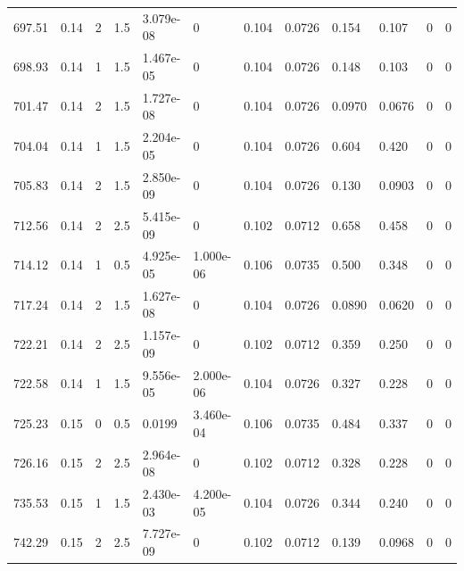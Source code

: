 \documentclass[preview]{standalone}
\begin{document}
{{{{{\begin{tabular}{L{1.2cm}C{1.2cm} C{0.3cm}C{0.5cm} C{1.4cm}C{1.4cm} C{1.4cm}C{1.4cm} C{1.6cm}C{1.6cm} C{1.6cm}C{1.6cm}}
  697.51  &  0.14  & 2     & 1.5 &  3.079e-08  & 0  &  0.104&   0.0726& 0.154 & 0.107   &  0 & 0  \\ 
  698.93  &  0.14  & 1     & 1.5 &  1.467e-05  & 0  &  0.104&   0.0726& 0.148 & 0.103   &  0 & 0  \\ 
  701.47  &  0.14  & 2     & 1.5 &  1.727e-08  & 0  &  0.104&   0.0726& 0.0970 & 0.0676   &  0 & 0  \\ 
  704.04  &  0.14  & 1     & 1.5 &  2.204e-05  & 0  &  0.104&   0.0726& 0.604 & 0.420   &  0 & 0  \\ 
  705.83  &  0.14  & 2     & 1.5 &  2.850e-09  & 0  &  0.104&   0.0726& 0.130 & 0.0903   &  0 & 0  \\ 
  712.56  &  0.14  & 2     & 2.5 &  5.415e-09  & 0  &  0.102&   0.0712& 0.658 & 0.458   &  0 & 0  \\ 
  714.12  &  0.14  & 1     & 0.5 &  4.925e-05  & 1.000e-06  &  0.106&   0.0735& 0.500 & 0.348   &  0 & 0  \\ 
  717.24  &  0.14  & 2     & 1.5 &  1.627e-08  & 0  &  0.104&   0.0726& 0.0890 & 0.0620   &  0 & 0  \\ 
  722.21  &  0.14  & 2     & 2.5 &  1.157e-09  & 0  &  0.102&   0.0712& 0.359 & 0.250   &  0 & 0  \\ 
  722.58  &  0.14  & 1     & 1.5 &  9.556e-05  & 2.000e-06  &  0.104&   0.0726& 0.327 & 0.228   &  0 & 0  \\ 
  725.23  &  0.15  & 0     & 0.5 &  0.0199  & 3.460e-04  &  0.106&   0.0735& 0.484 & 0.337   &  0 & 0  \\ 
  726.16  &  0.15  & 2     & 2.5 &  2.964e-08  & 0  &  0.102&   0.0712& 0.328 & 0.228   &  0 & 0  \\ 
  735.53  &  0.15  & 1     & 1.5 &  2.430e-03  & 4.200e-05  &  0.104&   0.0726& 0.344 & 0.240   &  0 & 0  \\ 
  742.29  &  0.15  & 2     & 2.5 &  7.727e-09  & 0  &  0.102&   0.0712& 0.139 & 0.0968   &  0 & 0  \\ 
\hline 
\end{tabular} 

}}}}}
\end{document}
